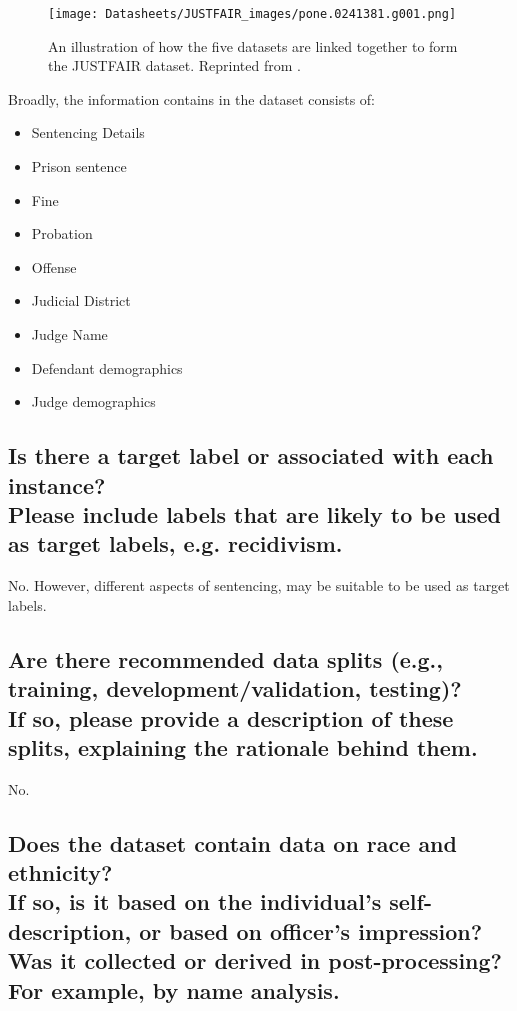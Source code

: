 \documentclass[letterpaper, 10 pt, conference]{ieeeconf}  %
\newcommand{\subtitle}[1]{{\\ \small \normalfont \color{purple} #1}}
\begin{document}
\begin{figure}[h]
    \centering
    \texttt{[image: Datasheets/JUSTFAIR\_images/pone.0241381.g001.png]}
    \caption{An illustration of how the five datasets are linked together to form the JUSTFAIR dataset. Reprinted from \cite{ciocanel2020justfair}.}
    \label{fig:link}
\end{figure}

Broadly, the information contains in the dataset consists of:

\begin{itemize}
    \item Sentencing Details
    \item Prison sentence
    \item Fine
    \item Probation
    \item Offense
    \item Judicial District
    \item Judge Name
    \item Defendant demographics
    \item Judge demographics
\end{itemize}

\subsection{Is there a target label or associated with each instance? \subtitle{Please include labels that are likely to be used as target labels, e.g. recidivism.}}

No. However, different aspects of sentencing, may be suitable to be used as target labels. 

\subsection{Are there recommended data splits (e.g., training, development/validation, testing)? \subtitle{If so, please provide a description of these splits, explaining the rationale behind them.}}

No.

\subsection{Does the dataset contain data on race and ethnicity? \subtitle{If so, is it based on the individual's self-description, or based on officer's impression? Was it collected or derived in post-processing? For example, by name analysis.}}
\end{document}
